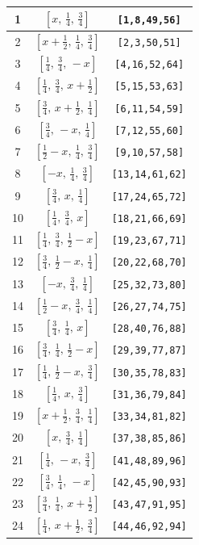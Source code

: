 \documentclass[fleqn,8pt]{jsarticle}
\begin{document}
\begin{longtable}{ccc}
1 & $\left[ x,\, \frac{1}{4},\, \frac{3}{4} \right]$ & {\tt [1,8,49,56]} \\ \hline
2 & $\left[ x + \frac{1}{2},\, \frac{1}{4},\, \frac{3}{4} \right]$ & {\tt [2,3,50,51]} \\ \hline
3 & $\left[ \frac{1}{4},\, \frac{3}{4},\, - x \right]$ & {\tt [4,16,52,64]} \\ \hline
4 & $\left[ \frac{1}{4},\, \frac{3}{4},\, x + \frac{1}{2} \right]$ & {\tt [5,15,53,63]} \\ \hline
5 & $\left[ \frac{3}{4},\, x + \frac{1}{2},\, \frac{1}{4} \right]$ & {\tt [6,11,54,59]} \\ \hline
6 & $\left[ \frac{3}{4},\, - x,\, \frac{1}{4} \right]$ & {\tt [7,12,55,60]} \\ \hline
7 & $\left[ \frac{1}{2} - x,\, \frac{1}{4},\, \frac{3}{4} \right]$ & {\tt [9,10,57,58]} \\ \hline
8 & $\left[ - x,\, \frac{1}{4},\, \frac{3}{4} \right]$ & {\tt [13,14,61,62]} \\ \hline
9 & $\left[ \frac{3}{4},\, x,\, \frac{1}{4} \right]$ & {\tt [17,24,65,72]} \\ \hline
10 & $\left[ \frac{1}{4},\, \frac{3}{4},\, x \right]$ & {\tt [18,21,66,69]} \\ \hline
11 & $\left[ \frac{1}{4},\, \frac{3}{4},\, \frac{1}{2} - x \right]$ & {\tt [19,23,67,71]} \\ \hline
12 & $\left[ \frac{3}{4},\, \frac{1}{2} - x,\, \frac{1}{4} \right]$ & {\tt [20,22,68,70]} \\ \hline
13 & $\left[ - x,\, \frac{3}{4},\, \frac{1}{4} \right]$ & {\tt [25,32,73,80]} \\ \hline
14 & $\left[ \frac{1}{2} - x,\, \frac{3}{4},\, \frac{1}{4} \right]$ & {\tt [26,27,74,75]} \\ \hline
15 & $\left[ \frac{3}{4},\, \frac{1}{4},\, x \right]$ & {\tt [28,40,76,88]} \\ \hline
16 & $\left[ \frac{3}{4},\, \frac{1}{4},\, \frac{1}{2} - x \right]$ & {\tt [29,39,77,87]} \\ \hline
17 & $\left[ \frac{1}{4},\, \frac{1}{2} - x,\, \frac{3}{4} \right]$ & {\tt [30,35,78,83]} \\ \hline
18 & $\left[ \frac{1}{4},\, x,\, \frac{3}{4} \right]$ & {\tt [31,36,79,84]} \\ \hline
19 & $\left[ x + \frac{1}{2},\, \frac{3}{4},\, \frac{1}{4} \right]$ & {\tt [33,34,81,82]} \\ \hline
20 & $\left[ x,\, \frac{3}{4},\, \frac{1}{4} \right]$ & {\tt [37,38,85,86]} \\ \hline
21 & $\left[ \frac{1}{4},\, - x,\, \frac{3}{4} \right]$ & {\tt [41,48,89,96]} \\ \hline
22 & $\left[ \frac{3}{4},\, \frac{1}{4},\, - x \right]$ & {\tt [42,45,90,93]} \\ \hline
23 & $\left[ \frac{3}{4},\, \frac{1}{4},\, x + \frac{1}{2} \right]$ & {\tt [43,47,91,95]} \\ \hline
24 & $\left[ \frac{1}{4},\, x + \frac{1}{2},\, \frac{3}{4} \right]$ & {\tt [44,46,92,94]} \\
\end{longtable}
\end{document}
